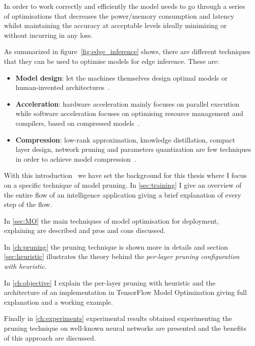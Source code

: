 In order to work correctly and efficiently the model needs to go through a
series of optimisations that decreases the power/memory consumption and latency
whilst maintaining the accuracy at acceptable levels \- ideally minimizing or
without incurring in any loss.

As summarized in figure~\ref{fig:edge_inference} shows, there are different
techniques that they can be used to optimise models for edge inference. These
are:

\begin{itemize}
    \item \textbf{Model design}: let the machines themselves design optimal
        models or human-invented architectures~\cite{xu2020edge}.
    \item \textbf{Acceleration}: hardware acceleration mainly focuses on
        parallel execution while software acceleration focuses on optimising
        resource management and compilers, based on compressed
        models~\cite{xu2020edge}.
    \item \textbf{Compression}: low-rank approximation, knowledge distillation,
        compact layer design, network pruning and parameters quantization are
        few techniques in order to achieve model compression~\cite{xu2020edge}.
\end{itemize}

With this introduction~\cite{xu2020edge} we have set the background for this
thesis where I focus on a specific technique of model pruning.
In \autoref{sec:training} I give an overview of the entire flow of an
intelligence application giving a brief explanation of every step of the flow.

In \autoref{sec:MO} the main techniques of model optimisation for
deployment, explaining are described and pros and cons discussed.

In \autoref{ch:pruning} the pruning technique is shown more in details and
section \autoref{sec:heuristic} illustrates the theory behind the
\textit{per-layer pruning configuration with heuristic}.

In \autoref{ch:objective} I explain the per-layer pruning with heuristic and
the architecture of an implementation in TensorFlow Model Optimization giving
full explanation and a working example.

Finally in \autoref{ch:experiments} experimental results obtained experimenting
the pruning technique on well-known neural networks are presented and the
benefits of this approach are discussed.


